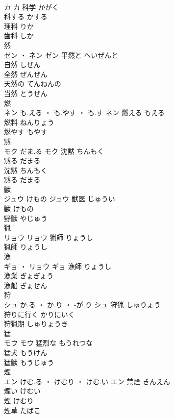\documentclass[8pt]{extreport}
\begin{document}
\begin{CJK}{UTF8}{min}
\\	カ		カ	科学	かがく	
\\	科する	かする	
\\	理科	りか	
\\	歯科	しか	
\\	然	
\\	ゼン ・ ネン		ゼン	平然と	へいぜんと	
\\	自然	しぜん	
\\	全然	ぜんぜん	
\\	天然の	てんねんの	
\\	当然	とうぜん	
\\	燃	
\\	ネン	も.える ・ も.やす ・ も.す	ネン	燃える	もえる	
\\	燃料	ねんりょう	
\\	燃やす	もやす	
\\	黙	
\\	モク	だま.る	モク	沈黙	ちんもく	
\\	黙る	だまる	
\\	沈黙	ちんもく	
\\	黙る	だまる	
\\	獣	
\\	ジュウ	けもの	ジュウ	獣医	じゅうい	
\\	獣	けもの	
\\	野獣	やじゅう	
\\	猟	
\\	リョウ		リョウ	猟師	りょうし	
\\	猟師	りょうし	
\\	漁	
\\	ギョ ・ リョウ		ギョ	漁師	りょうし	
\\	漁業	ぎょぎょう	
\\	漁船	ぎょせん	
\\	狩	
\\	シュ	か.る ・ か.り ・ -が.り	シュ	狩猟	しゅりょう	
\\	狩りに行く	かりにいく	
\\	狩猟期	しゅりょうき	
\\	猛	
\\	モウ		モウ	猛烈な	もうれつな	
\\	猛犬	もうけん	
\\	猛獣	もうじゅう	
\\	煙	
\\	エン	けむ.る ・ けむり ・ けむ.い	エン	禁煙	きんえん	
\\	煙い	けむい	
\\	煙	けむり	
\\	煙草	たばこ	

\end{CJK}
\end{document}
